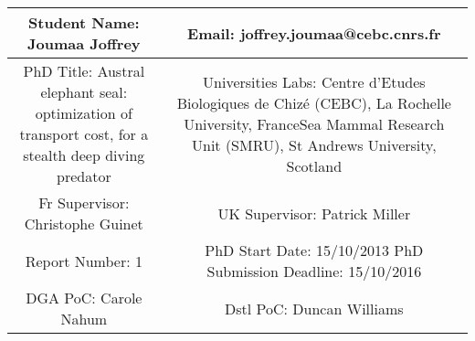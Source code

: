 \documentclass[12pt,a4paper]{report}
\begin{document}
\begin{tabular}{|c|c|}
\hline 
Student Name: Joumaa Joffrey & Email: joffrey.joumaa@cebc.cnrs.fr \\ 
\hline 
PhD Title: Austral elephant seal: optimization of transport cost, for a stealth deep diving predator & Universities  Labs: Centre d’Etudes Biologiques de Chizé (CEBC), La Rochelle University, FranceSea Mammal Research Unit (SMRU), St Andrews University, Scotland
 \\ 
\hline 
Fr Supervisor: Christophe Guinet & UK Supervisor: Patrick Miller \\ 
\hline 
Report Number: 1 & PhD Start Date: 15/10/2013
PhD Submission Deadline: 15/10/2016
 \\ 
\hline 
DGA PoC: Carole Nahum & Dstl PoC: Duncan Williams \\ 
\hline 
\end{tabular} 
\end{document}
